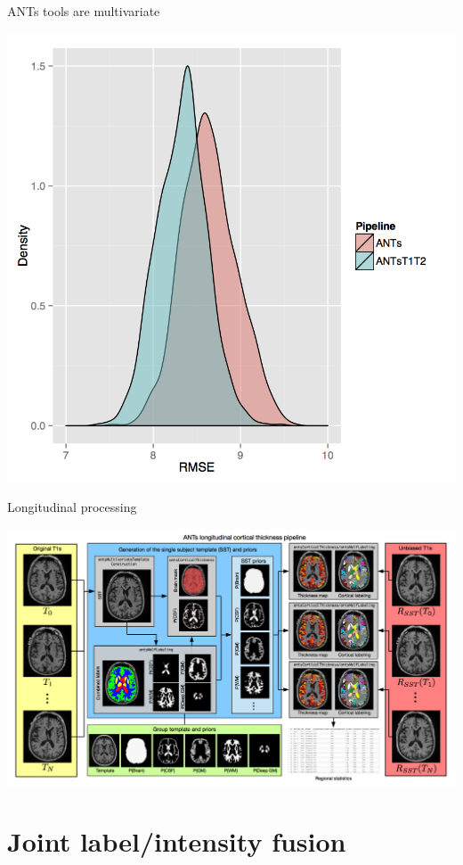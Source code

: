 \documentclass[ignorenonframetext,]{beamer}
\begin{document}
\begin{frame}{ANTs tools are multivariate}

\includegraphics{./evaluation/figures/rfRmse05ANTsT1T2.png}

\end{frame}

\begin{frame}{Longitudinal processing}

\includegraphics{./longitudinal/figures/longitudinalPipeline.png}

\end{frame}

\section{Joint label/intensity
fusion}\label{joint-labelintensity-fusion}
\end{document}
